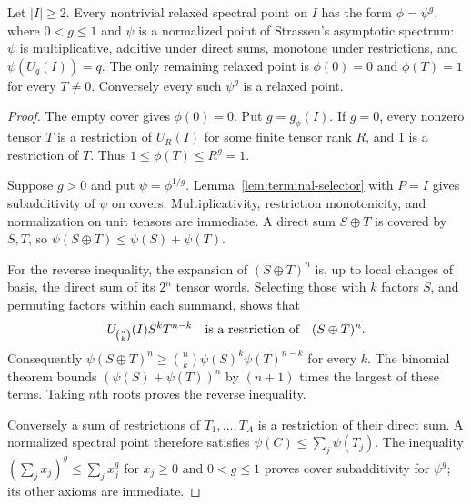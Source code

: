 \begin{theorem}\label{thm:normalization}
Let $|I|\geq2$. Every nontrivial relaxed spectral point on $I$ has the form $\phi=\psi^g$, where $0<g\leq1$ and $\psi$ is a normalized point of Strassen's asymptotic spectrum: $\psi$ is multiplicative, additive under direct sums, monotone under restrictions, and $\psi(U_q(I))=q$. The only remaining relaxed point is $\phi(0)=0$ and $\phi(T)=1$ for every $T\ne0$. Conversely every such $\psi^g$ is a relaxed point.
\end{theorem}
\begin{proof}
The empty cover gives $\phi(0)=0$. Put $g=g_\phi(I)$. If $g=0$, every nonzero tensor $T$ is a restriction of $U_R(I)$ for some finite tensor rank $R$, and $1$ is a restriction of $T$. Thus $1\leq\phi(T)\leq R^g=1$.

Suppose $g>0$ and put $\psi=\phi^{1/g}$. Lemma~\ref{lem:terminal-selector} with $P=I$ gives subadditivity of $\psi$ on covers. Multiplicativity, restriction monotonicity, and normalization on unit tensors are immediate. A direct sum $S\oplus T$ is covered by $S,T$, so $\psi(S\oplus T)\leq\psi(S)+\psi(T)$.

For the reverse inequality, the expansion of $(S\oplus T)^n$ is, up to local changes of basis, the direct sum of its $2^n$ tensor words. Selecting those with $k$ factors $S$, and permuting factors within each summand, shows that
\[
 U_{\binom nk}(I)S^kT^{n-k}
 \quad\hbox{is a restriction of}\quad(S\oplus T)^n.
\]
Consequently $\psi(S\oplus T)^n\geq\binom nk\psi(S)^k\psi(T)^{n-k}$ for every $k$. The binomial theorem bounds $(\psi(S)+\psi(T))^n$ by $(n+1)$ times the largest of these terms. Taking $n$th roots proves the reverse inequality.

Conversely a sum of restrictions of $T_1,\ldots,T_A$ is a restriction of their direct sum. A normalized spectral point therefore satisfies $\psi(C)\leq\sum_j\psi(T_j)$. The inequality $(\sum_j x_j)^g\leq\sum_jx_j^g$ for $x_j\geq0$ and $0<g\leq1$ proves cover subadditivity for $\psi^g$; its other axioms are immediate.
\end{proof}

